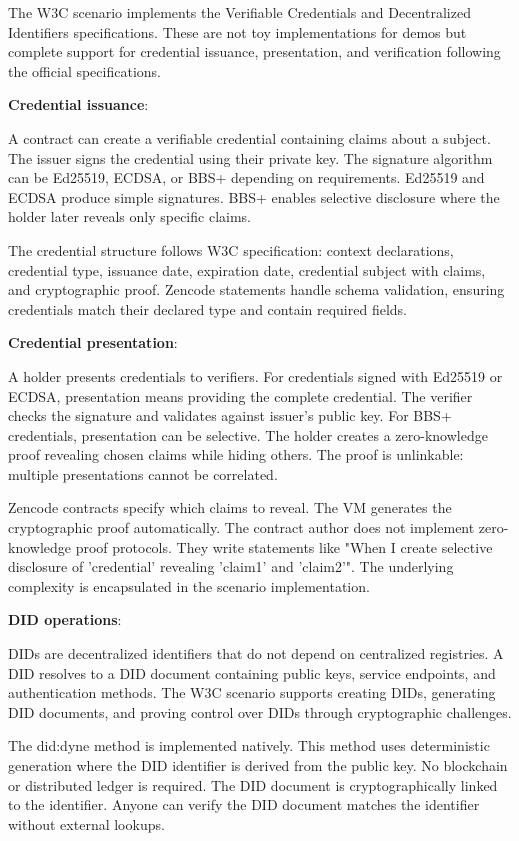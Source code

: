The W3C scenario implements the Verifiable Credentials and
Decentralized Identifiers specifications. These are not toy
implementations for demos but complete support for credential
issuance, presentation, and verification following the official
specifications.

\textbf{Credential issuance}:

A contract can create a verifiable credential containing claims about
a subject. The issuer signs the credential using their private
key. The signature algorithm can be Ed25519, ECDSA, or BBS+ depending
on requirements. Ed25519 and ECDSA produce simple signatures. BBS+
enables selective disclosure where the holder later reveals only
specific claims.

The credential structure follows W3C specification: context
declarations, credential type, issuance date, expiration date,
credential subject with claims, and cryptographic proof. Zencode
statements handle schema validation, ensuring credentials match their
declared type and contain required fields.

\textbf{Credential presentation}:

A holder presents credentials to verifiers. For credentials signed
with Ed25519 or ECDSA, presentation means providing the complete
credential. The verifier checks the signature and validates against
issuer's public key. For BBS+ credentials, presentation can be
selective. The holder creates a zero-knowledge proof revealing chosen
claims while hiding others. The proof is unlinkable: multiple
presentations cannot be correlated.

Zencode contracts specify which claims to reveal. The VM generates the
cryptographic proof automatically. The contract author does not
implement zero-knowledge proof protocols. They write statements like
"When I create selective disclosure of 'credential' revealing 'claim1'
and 'claim2'". The underlying complexity is encapsulated in the
scenario implementation.

\textbf{DID operations}:

DIDs are decentralized identifiers that do not depend on centralized
registries. A DID resolves to a DID document containing public keys,
service endpoints, and authentication methods. The W3C scenario
supports creating DIDs, generating DID documents, and proving control
over DIDs through cryptographic challenges.

The did:dyne method is implemented natively. This method uses
deterministic generation where the DID identifier is derived from the
public key. No blockchain or distributed ledger is required. The DID
document is cryptographically linked to the identifier. Anyone can
verify the DID document matches the identifier without external
lookups.

